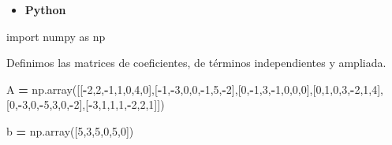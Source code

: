 \documentclass[
]{article}
\newenvironment{Shaded}{\begin{snugshade}}{\end{snugshade}}
\newcommand{\DecValTok}[1]{\textcolor[rgb]{0.00,0.00,0.81}{#1}}
\newcommand{\ImportTok}[1]{#1}
\newcommand{\NormalTok}[1]{#1}
\newcommand{\OperatorTok}[1]{\textcolor[rgb]{0.81,0.36,0.00}{\textbf{#1}}}
\providecommand{\tightlist}{%
  \setlength{\itemsep}{0pt}\setlength{\parskip}{0pt}}
\begin{document}
\begin{itemize}
\tightlist
\item
  \textbf{Python}
\end{itemize}

\begin{Shaded}
\begin{Highlighting}[]
\ImportTok{import}\NormalTok{ numpy }\ImportTok{as}\NormalTok{ np}
\end{Highlighting}
\end{Shaded}

Definimos las matrices de coeficientes, de términos independientes y
ampliada.

\begin{Shaded}
\begin{Highlighting}[]
\NormalTok{A }\OperatorTok{=}\NormalTok{ np.array([[}\OperatorTok{-}\DecValTok{2}\NormalTok{,}\DecValTok{2}\NormalTok{,}\OperatorTok{-}\DecValTok{1}\NormalTok{,}\DecValTok{1}\NormalTok{,}\DecValTok{0}\NormalTok{,}\DecValTok{4}\NormalTok{,}\DecValTok{0}\NormalTok{],[}\OperatorTok{-}\DecValTok{1}\NormalTok{,}\OperatorTok{-}\DecValTok{3}\NormalTok{,}\DecValTok{0}\NormalTok{,}\DecValTok{0}\NormalTok{,}\OperatorTok{-}\DecValTok{1}\NormalTok{,}\DecValTok{5}\NormalTok{,}\OperatorTok{-}\DecValTok{2}\NormalTok{],[}\DecValTok{0}\NormalTok{,}\OperatorTok{-}\DecValTok{1}\NormalTok{,}\DecValTok{3}\NormalTok{,}\OperatorTok{-}\DecValTok{1}\NormalTok{,}\DecValTok{0}\NormalTok{,}\DecValTok{0}\NormalTok{,}\DecValTok{0}\NormalTok{],[}\DecValTok{0}\NormalTok{,}\DecValTok{1}\NormalTok{,}\DecValTok{0}\NormalTok{,}\DecValTok{3}\NormalTok{,}\OperatorTok{-}\DecValTok{2}\NormalTok{,}\DecValTok{1}\NormalTok{,}\DecValTok{4}\NormalTok{],[}\DecValTok{0}\NormalTok{,}\OperatorTok{-}\DecValTok{3}\NormalTok{,}\DecValTok{0}\NormalTok{,}\OperatorTok{-}\DecValTok{5}\NormalTok{,}\DecValTok{3}\NormalTok{,}\DecValTok{0}\NormalTok{,}\OperatorTok{-}\DecValTok{2}\NormalTok{],[}\OperatorTok{-}\DecValTok{3}\NormalTok{,}\DecValTok{1}\NormalTok{,}\DecValTok{1}\NormalTok{,}\DecValTok{1}\NormalTok{,}\OperatorTok{-}\DecValTok{2}\NormalTok{,}\DecValTok{2}\NormalTok{,}\DecValTok{1}\NormalTok{]])}

\NormalTok{b }\OperatorTok{=}\NormalTok{ np.array([}\DecValTok{5}\NormalTok{,}\DecValTok{3}\NormalTok{,}\DecValTok{5}\NormalTok{,}\DecValTok{0}\NormalTok{,}\DecValTok{5}\NormalTok{,}\DecValTok{0}\NormalTok{])}


\end{Highlighting}
\end{Shaded}
\end{document}
